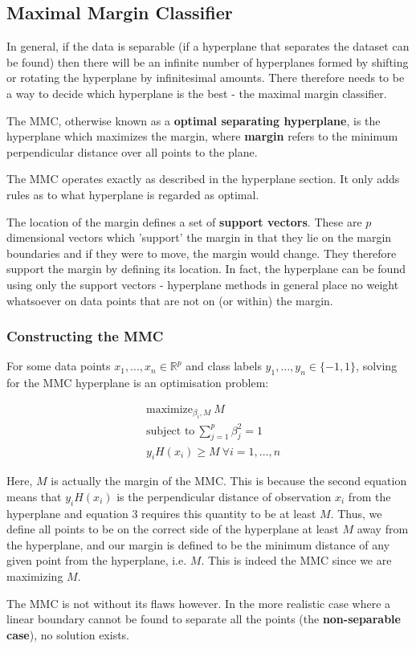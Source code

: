 \subsection{Maximal Margin Classifier}

In general, if the data is separable (if a hyperplane that separates the dataset can be found) then there will be an infinite number of hyperplanes formed by shifting or rotating the hyperplane by infinitesimal amounts. There therefore needs to be a way to decide which hyperplane is the best - the maximal margin classifier.

The MMC, otherwise known as a \textbf{optimal separating hyperplane}, is the hyperplane which maximizes the margin, where \textbf{margin} refers to the minimum perpendicular distance over all points to the plane.

The MMC operates exactly as described in the hyperplane section. It only adds rules as to what hyperplane is regarded as optimal.

The location of the margin defines a set of \textbf{support vectors}. These are $p$ dimensional vectors which 'support' the margin in that they lie on the margin boundaries and if they were to move, the margin would change. They therefore support the margin by defining its location. In fact, the hyperplane can be found using only the support vectors - hyperplane methods in general place no weight whatsoever on data points that are not on (or within) the margin.

\subsubsection{Constructing the MMC}

For some data points $x_{1},...,x_{n}\in \mathbb{R}^{p}$ and class labels $y_{1},...,y_{n}\in\{-1,1\}$, solving for the MMC hyperplane is an optimisation problem:

\begin{align*}
    &\text{maximize}_{\beta_{i},M}\: M \\
    &\text{subject to}\: \sum_{j=1}^{p}\beta_{j}^{2}=1 \\
    &y_{i}H(x_{i}) \ge M\: \forall i=1,...,n
\end{align*}

Here, $M$ is actually the margin of the MMC. This is because the second equation means that $y_{i}H(x_{i})$ is the perpendicular distance of observation $x_{i}$ from the hyperplane and equation 3 requires this quantity to be at least $M$. Thus, we define all points to be on the correct side of the hyperplane at least $M$ away from the hyperplane, and our margin is defined to be the minimum distance of any given point from the hyperplane, i.e. $M$. This is indeed the MMC since we are maximizing $M$.

The MMC is not without its flaws however. In the more realistic case where a linear boundary cannot be found to separate all the points (the \textbf{non-separable case}), no solution exists.
